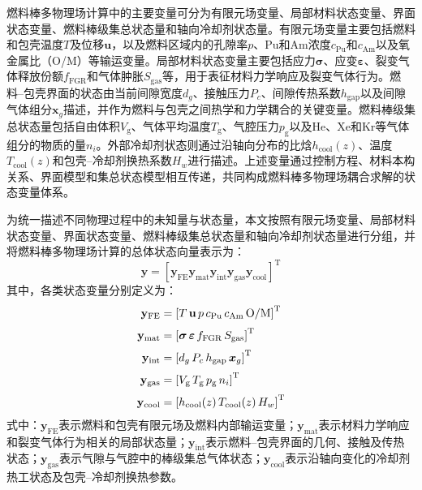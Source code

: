 \label{subsec:ch2_variables_coupling}

燃料棒多物理场计算中的主要变量可分为有限元场变量、局部材料状态变量、界面状态变量、燃料棒级集总状态量和轴向冷却剂状态量。有限元场变量主要包括燃料和包壳温度$T$及位移$\mathbf{u}$，以及燃料区域内的孔隙率$p$、Pu和Am浓度$c_{\mathrm{Pu}}$和$c_{\mathrm{Am}}$以及氧金属比（O/M）等输运变量。局部材料状态变量主要包括应力$\boldsymbol{\sigma}$、应变$\boldsymbol{\varepsilon}$、裂变气体释放份额$f_{\mathrm{FGR}}$和气体肿胀$S_{\mathrm{gas}}$等，用于表征材料力学响应及裂变气体行为。燃料--包壳界面的状态由当前间隙宽度$d_g$、接触压力$P_c$、间隙传热系数$h_{\mathrm{gap}}$以及间隙气体组分$\boldsymbol{x}_g$描述，并作为燃料与包壳之间热学和力学耦合的关键变量。燃料棒级集总状态量包括自由体积$V_{\mathrm g}$、气体平均温度$T_{\mathrm g}$、气腔压力$p_{\mathrm g}$以及He、Xe和Kr等气体组分的物质的量$n_i$。外部冷却剂状态则通过沿轴向分布的比{\rarecharfont 焓}$h_{\mathrm{cool}}(z)$、温度$T_{\mathrm{cool}}(z)$和包壳--冷却剂换热系数$H_w$进行描述。上述变量通过控制方程、材料本构关系、界面模型和集总状态模型相互传递，共同构成燃料棒多物理场耦合求解的状态变量体系。

为统一描述不同物理过程中的未知量与状态量，本文按照有限元场变量、局部材料状态变量、界面状态变量、燃料棒级集总状态量和轴向冷却剂状态量进行分组，并将燃料棒多物理场计算的总体状态向量表示为：
\begin{equation}
	\mathbf y=
	\left[
		\mathbf y_{\mathrm{FE}}
		\mathbf y_{\mathrm{mat}}
		\mathbf y_{\mathrm{int}}
		\mathbf y_{\mathrm{gas}}
		\mathbf y_{\mathrm{cool}}
		\right]^{\mathrm T}
	\label{eq:ch2_state_vector}
\end{equation}
其中，各类状态变量分别定义为：
\begin{align}
	\mathbf y_{\mathrm{FE}}
	 & =
	\left[
		T\,
		\mathbf u\,
		p\,
		c_{\mathrm{Pu}}\,
		c_{\mathrm{Am}}\,
		\mathrm{O/M}
		\right]^{\mathrm T}
	\notag
	\\[0.5ex]
	\mathbf y_{\mathrm{mat}}
	 & =
	\left[
		\boldsymbol{\sigma}\,
		\boldsymbol{\varepsilon}\,
		f_{\mathrm{FGR}}\,
		S_{\mathrm{gas}}
		\right]^{\mathrm T}
	\notag
	\\[0.5ex]
	\mathbf y_{\mathrm{int}}
	 & =
	\left[
		d_g\,
		P_c\,
		h_{\mathrm{gap}}\,
		\boldsymbol{x}_g
		\right]^{\mathrm T}
	\notag
	\\[0.5ex]
	\mathbf y_{\mathrm{gas}}
	 & =
	\left[
		V_{\mathrm g}\,
		T_{\mathrm g}\,
		p_{\mathrm g}\,
		n_i
		\right]^{\mathrm T}
	\notag
	\\[0.5ex]
	\mathbf y_{\mathrm{cool}}
	 & =
	\left[
		h_{\mathrm{cool}}(z)\,
		T_{\mathrm{cool}}(z)\,
		H_w
		\right]^{\mathrm T}
	\label{eq:ch2_state_subvectors}
\end{align}
\noindent 式中：$\mathbf y_{\mathrm{FE}}$表示燃料和包壳有限元场及燃料内部输运变量；$\mathbf y_{\mathrm{mat}}$表示材料力学响应和裂变气体行为相关的局部状态量；$\mathbf y_{\mathrm{int}}$表示燃料--包壳界面的几何、接触及传热状态；$\mathbf y_{\mathrm{gas}}$表示气隙与气腔中的棒级集总气体状态；$\mathbf y_{\mathrm{cool}}$表示沿轴向变化的冷却剂热工状态及包壳--冷却剂换热参数。

